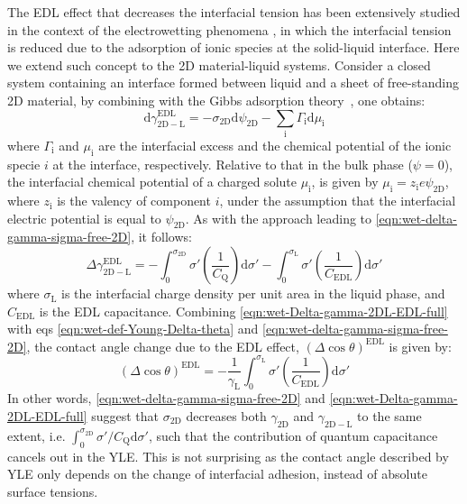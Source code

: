 The EDL effect that decreases the interfacial tension has been
extensively studied in the context of the electrowetting phenomena
\autocite{Mugele_2005_EW_rev}, in which the interfacial tension is reduced due to
the adsorption of ionic species at the solid-liquid interface.
%
Here we
extend such concept to the 2D material-liquid systems.
%
Consider a
closed system containing an interface formed between liquid and a
sheet of free-standing 2D material, by combining with the Gibbs
adsorption theory~\autocite{Bard_1980_electrochem_book}, one obtains:
\begin{equation}
\label{eq:wet-gibbs}
\mathrm{d} \gamma_{\mathrm{2D-L}}^{\mathrm{EDL}} = -\sigma_{\mathrm{2D}} \mathrm{d} \psi_{\mathrm{2D}}
                                                   -\sum_{\mathrm{i}} \Gamma_{\mathrm{i}} \mathrm{d}\mu_{\mathrm{i}}
\end{equation}
where \(\Gamma_{\mathrm{i}}\) and \(\mu_{\mathrm{i}}\) are the interfacial
excess and the chemical potential of the ionic specie \(i\) at the
interface, respectively. Relative to that in the bulk phase
(\(\psi=0\)), the interfacial chemical potential of a charged solute
\(\mu_{\mathrm{i}}\), is given by
\(\mu_{\mathrm{i}}=z_{\mathrm{i}}e\psi_{\mathrm{2D}}\), where
\(z_{\mathrm{i}}\) is the valency of component \(i\), under the assumption
that the interfacial electric potential is equal to
\(\psi_{\mathrm{2D}}\). As with the approach leading to
\autoref{eqn:wet-delta-gamma-sigma-free-2D}, it follows:
\begin{equation}
\label{eqn:wet-Delta-gamma-2DL-EDL-full}
\Delta \gamma_{\mathrm{2D-L}}^{\mathrm{EDL}} = 
-\int_{0}^{\sigma_{\mathrm{2D}}} \sigma' \left(\frac{1}{C_{\mathrm{Q}}}\right) \mathrm{d}\sigma'
-\int_{0}^{\sigma_{\mathrm{L}}} \sigma' \left(\frac{1}{C_{\mathrm{EDL}}}\right) \mathrm{d}\sigma'
\end{equation}
where \(\sigma_{\mathrm{L}}\) is the interfacial charge density per unit
area in the liquid phase, and \(C_{\mathrm{EDL}}\) is the EDL
capacitance.
%
Combining \autoref{eqn:wet-Delta-gamma-2DL-EDL-full} with eqs
\autoref{eqn:wet-def-Young-Delta-theta} and \autoref{eqn:wet-delta-gamma-sigma-free-2D},
the contact angle change due to the EDL effect, \((\Delta \cos
\theta)^{\mathrm{EDL}}\) is given by:
\begin{equation}
\label{eqn:wet-Delta-cos-EDL}
(\Delta \cos \theta)^{\mathrm{EDL}} = -\frac{1}{\gamma_{\mathrm{L}}}
                                      \int_{0}^{\sigma_{\mathrm{L}}} \sigma' 
                                      \left(\frac{1}{C_{\mathrm{EDL}}}\right) \mathrm{d}\sigma'
\end{equation}
In other words, \autoref{eqn:wet-delta-gamma-sigma-free-2D} and
\autoref{eqn:wet-Delta-gamma-2DL-EDL-full} suggest that \(\sigma_{\mathrm{2D}}\)
decreases both \(\gamma_{\mathrm{2D}}\) and \(\gamma_{\mathrm{2D-L}}\) to
the same extent, i.e. \(\int_{0}^{\sigma_{\mathrm{2D}}}
\sigma'/C_{\mathrm{Q}} \mathrm{d}\sigma'\), such that the contribution
of quantum capacitance cancels out in the YLE.
%
This is not surprising as the contact angle described by YLE only
depends on the change of interfacial adhesion, instead of absolute
surface tensions.

